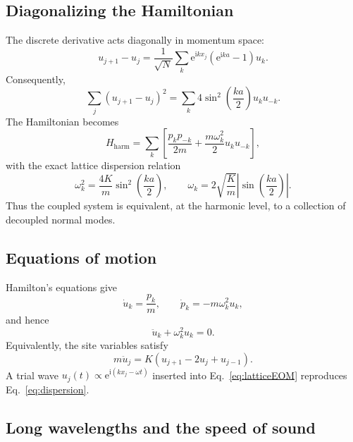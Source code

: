 \documentclass[11pt]{article}
\newcommand{\e}{\mathrm{e}}
\newcommand{\ii}{\mathrm{i}}
\begin{document}
\subsection{Diagonalizing the Hamiltonian}

The discrete derivative acts diagonally in momentum space:
\begin{equation}
  u_{j+1}-u_j
  =\frac{1}{\sqrt N}\sum_k
  \e^{\ii kx_j}(\e^{\ii ka}-1)u_k.
\end{equation}
Consequently,
\begin{equation}
  \sum_j(u_{j+1}-u_j)^2
  =\sum_k 4\sin^2\left(\frac{ka}{2}\right)u_ku_{-k}.
\end{equation}
The Hamiltonian becomes
\begin{equation}
  H_{\mathrm{harm}}
  =\sum_k\left[
    \frac{p_kp_{-k}}{2m}
    +\frac{m\omega_k^2}{2}u_ku_{-k}
  \right],
  \label{eq:Hnormal}
\end{equation}
with the exact lattice dispersion relation
\begin{equation}
  \boxed{
  \omega_k^2
  =\frac{4K}{m}\sin^2\left(\frac{ka}{2}\right),
  \qquad
  \omega_k=2\sqrt{\frac Km}
  \left|\sin\left(\frac{ka}{2}\right)\right|.
  }
  \label{eq:dispersion}
\end{equation}
Thus the coupled system is equivalent, at the harmonic level, to a
collection of decoupled normal modes.

\subsection{Equations of motion}

Hamilton's equations give
\begin{equation}
  \dot u_k=\frac{p_k}{m},
  \qquad
  \dot p_k=-m\omega_k^2u_k,
\end{equation}
and hence
\begin{equation}
  \ddot u_k+\omega_k^2u_k=0.
  \label{eq:modeEOM}
\end{equation}
Equivalently, the site variables satisfy
\begin{equation}
  m\ddot u_j
  =K(u_{j+1}-2u_j+u_{j-1}).
  \label{eq:latticeEOM}
\end{equation}
A trial wave $u_j(t)\propto\e^{\ii(kx_j-\omega t)}$ inserted into
Eq.~\eqref{eq:latticeEOM} reproduces Eq.~\eqref{eq:dispersion}.

\subsection{Long wavelengths and the speed of sound}
\end{document}
